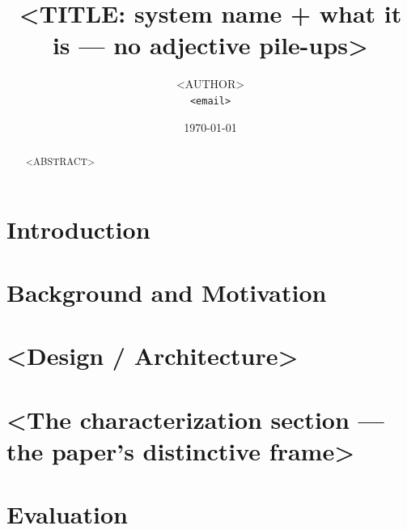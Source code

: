 \documentclass{article}          %
\title{<TITLE: system name + what it is — no adjective pile-ups>}
\author{<AUTHOR>\\ \texttt{<email>}}
\date{\today}
\begin{document}
\maketitle

\begin{abstract}
<ABSTRACT>
\end{abstract}

\section{Introduction}
\label{sec:intro}
%

\section{Background and Motivation}
\label{sec:background}

\section{<Design / Architecture>}
\label{sec:design}

\section{<The characterization section — the paper's distinctive frame>}
\label{sec:anatomy}


\section{Evaluation}
\label{sec:eval}
\end{document}
